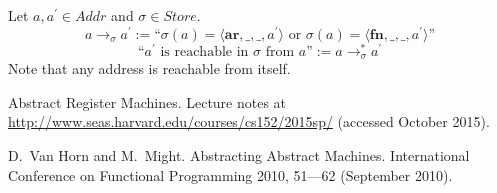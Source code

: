 \RequirePackage[hyphens]{url}\documentclass[12pt,oneside]{amsart}
\newcommand{\kw}[1]{\mathbf{#1}}
\begin{document}
Let $a, a^\prime\in Addr$ and $\sigma\in Store$.
\[a\longrightarrow_{\sigma}a^\prime :=
    \text{``$\sigma(a)=\langle\kw{ar},\_,\_,a^\prime\rangle$ or $\sigma(a)=\langle\kw{fn},\_,\_,a^\prime\rangle$''}\]
\[\text{``$a^\prime$ is reachable in $\sigma$ from $a$''} :=
    a\longrightarrow_{\sigma}^\ast a^\prime\]
Note that any address is reachable from itself.

\begin{thebibliography}{99}

 Abstract Register Machines. Lecture notes at \url{http://www.seas.harvard.edu/courses/cs152/2015sp/} (accessed October 2015).

 D.~Van Horn and M.~Might. Abstracting Abstract Machines. International Conference on Functional Programming 2010, 51---62 (September 2010).

\end{thebibliography}
\end{document}
